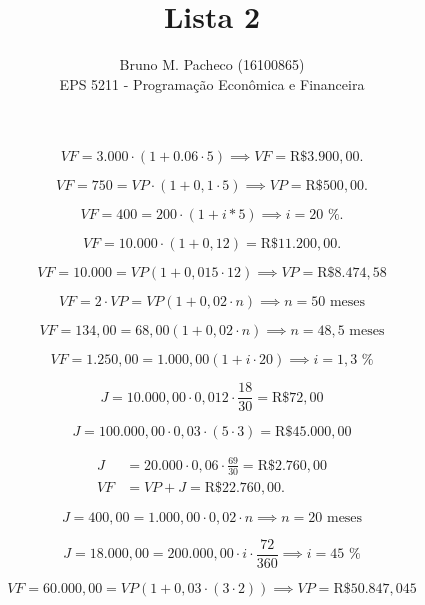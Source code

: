 \documentclass[a4paper]{report}
\begin{document}
 
\title{Lista 2}
\author{Bruno M. Pacheco (16100865)\\
EPS 5211 - Programação Econômica e Financeira}
 
\maketitle
 

\[
VF = 3.000\cdot \left( 1 + 0.06 \cdot  5 \right) \implies VF = \text{R\$ }3.900,00
.\] 


\[
    VF = 750 = VP\cdot \left( 1 + 0,1 \cdot 5 \right) \implies VP = \text{R\$ }500,00
.\] 


\[
VF = 400 = 200 \cdot \left( 1 + i * 5 \right) \implies i = 20\text{ \%}
.\] 


\[
VF = 10.000\cdot \left( 1 + 0,12 \right) = \text{R\$ }11.200,00
.\] 


\[
VF = 10.000 = VP \left( 1 + 0,015 \cdot 12 \right) \implies VP = \text{R\$ }8.474,58
\] 


\[
VF = 2\cdot VP = VP \left( 1 + 0,02 \cdot n \right) \implies n = 50\text{ meses}
\] 


\[
VF = 134,00 = 68,00 \left( 1 + 0,02 \cdot n \right) \implies n = 48,5\text{ meses}
\] 


\[
    VF = 1.250,00 = 1.000,00 \left( 1 + i\cdot 20 \right) \implies i = 1,3\text{ \%}
\] 


\[
J = 10.000,00 \cdot 0,012 \cdot \frac{18}{30} = \text{R\$ }72,00
\] 


\[
J = 100.000,00 \cdot 0,03 \cdot \left( 5 \cdot 3 \right) = \text{R\$ }45.000,00
\] 


\begin{align*}
    J &=20.000 \cdot 0,06 \cdot \frac{69}{30} = \text{R\$ }2.760,00 \\
    VF &= VP + J = \text{R\$ }22.760,00
.\end{align*}


\[
J = 400,00 = 1.000,00 \cdot 0,02 \cdot n \implies n = 20\text{ meses}
\] 


\[
J = 18.000,00 = 200.000,00 \cdot i \cdot \frac{72}{360} \implies i = 45\text{ \%}
\] 


\[
    VF = 60.000,00 = VP \left( 1 + 0,03\cdot (3\cdot 2) \right) \implies VP = \text{R\$ }50.847,045
\] 
\end{document}
